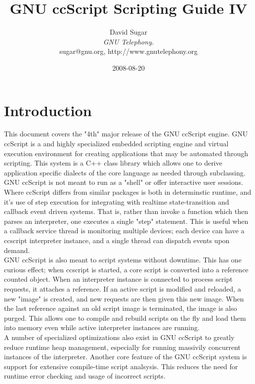 \documentclass[a4paper,12pt]{article}
\date{2008-08-20}
\title{GNU ccScript Scripting Guide IV}
\author{
David Sugar \\
{\em GNU Telephony.}\\
{\normalsize sugar@gnu.org, http://www.gnutelephony.org} \\
}
\begin{document}

\maketitle

\tableofcontents

\newpage

\section{Introduction}

This document covers the "4th" major release of the GNU ccScript engine.  GNU
ccScript is a and highly specialized embedded scripting engine and virtual
execution environment for creating applications that may be automated through
scripting.  This system is a C++ class library which allows one to derive
application specific dialects of the core language as needed through
subclassing.   GNU ccScript is not meant to run as a "shell" or offer
interactive user sessions.  \\

Where ccScript differs from similar packages is both in determinstic
runtime, and it's use of step execution for integrating with realtime
state-transition and callback event driven systems.  That is, rather 
than invoke a function which then parses an interpreter, one executes a 
single "step" statement. This is useful when a callback service thread 
is monitoring multiple devices; each device can have a ccscript 
interpreter instance, and a single thread can dispatch events upon 
demand. \\

GNU ccScript is also meant to script systems without downtime.  This has
one curious effect; when ccscript is started, a core script is converted
into a reference counted object.  When an interpreter instance is connected
to process script requests, it attaches a reference.  If an active script 
is modified and reloaded, a new "image" is created, and new requests are 
then given this new image.  When the last reference against an old 
script image is terminated, the image is also purged.  This allows one 
to compile and rebuild scripts on the fly and load them into memory even 
while active interpreter instances are running. \\

A number of specialized optimizations also exist in GNU ccScript to greatly
reduce runtime heap management, especially for running massivily concurrent
instances of the interpreter.  Another core feature of the GNU ccScript
system is support for extensive compile-time script analsysis.  This reduces
the need for runtime error checking and usage of incorrect scripts. \\
\end{document}
